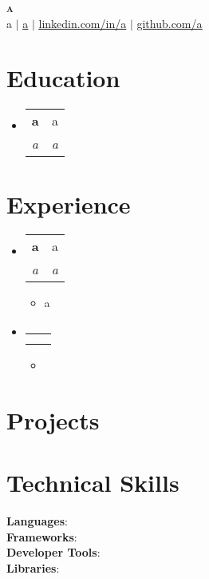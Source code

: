 \documentclass[letterpaper,11pt]{article}
\makeatletter
\newcommand{\resumeItem}[1]{
    \item\small{
      {#1 \vspace{-2pt}}
    }
  }
\newcommand{\resumeSubheading}[4]{
    \vspace{-2pt}\item
      \begin{tabular*}{0.97\textwidth}[t]{l@{\extracolsep{\fill}}r}
        \textbf{#1} & #2 \\
        \textit{\small#3} & \textit{\small #4} \\
      \end{tabular*}\vspace{-7pt}
  }
\newcommand{\resumeSubHeadingListStart}{\begin{itemize}[leftmargin=0.15in, label={}]}
\newcommand{\resumeSubHeadingListEnd}{\end{itemize}}
\newcommand{\resumeItemListStart}{\begin{itemize}}
\newcommand{\resumeItemListEnd}{\end{itemize}\vspace{-5pt}}
\makeatother
\begin{document}
  
  \begin{center}
      \textbf{\Huge \scshape a} \\ \vspace{1pt}
      \small a $|$ \href{mailto:a}{\underline{a}} $|$ 
      \href{a}{\underline{linkedin.com/in/a}} $|$
      \href{a}{\underline{github.com/a}}
  \end{center}
  
  
  \section{Education}
    \resumeSubHeadingListStart
      
      \resumeSubheading
        {a}{a}
        {a}{a}
    
    \resumeSubHeadingListEnd
  
  
  \section{Experience}
    \resumeSubHeadingListStart
      
      \resumeSubheading
        {a}{a}
        {a}{a}
        \resumeItemListStart
          \resumeItem{a}
        \resumeItemListEnd
    
      \resumeSubheading
        {}{}
        {}{}
        \resumeItemListStart
          \resumeItem{}
        \resumeItemListEnd
    
    \resumeSubHeadingListEnd
  
  
  \section{Projects}
      \resumeSubHeadingListStart
        
      \resumeSubHeadingListEnd
  
  
  
  \section{Technical Skills}
   \begin{itemize}[leftmargin=0.15in, label={}]
      \small{\item{
       
       \textbf{Languages}:  \\
       \textbf{Frameworks}:  \\
       \textbf{Developer Tools}:  \\
       \textbf{Libraries}: 
    
      }}
   \end{itemize}
  
  
  
\end{document}
